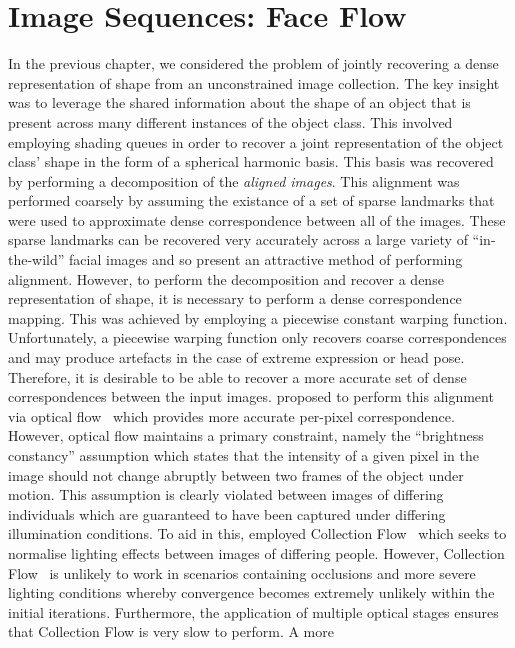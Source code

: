 \chapter{Image Sequences: Face Flow}\label{ch:face_flow}
\minitoc{}
In the previous chapter, we considered the problem of jointly recovering a
dense representation of shape from an unconstrained image collection. The key
insight was to leverage the shared information about the shape of an object
that is present across many different instances of the object class. This
involved employing shading queues in order to recover a joint representation
of the object class' shape in the form of a spherical harmonic basis. This
basis was recovered by performing a decomposition of the
\textit{aligned images}. This alignment was performed coarsely by assuming the
existance of a set of sparse landmarks that were used to approximate
dense correspondence between all of the images. These sparse landmarks can
be recovered very accurately across a large variety of ``in-the-wild'' facial
images and so present an attractive method of performing alignment. However,
to perform the decomposition and recover a dense representation of shape, it
is necessary to perform a dense correspondence mapping. This was achieved
by employing a piecewise constant warping function. Unfortunately, a
piecewise warping function only recovers coarse correspondences and may produce
artefacts in the case of extreme expression or head pose. Therefore, it is
desirable to be able to recover a more accurate set of dense correspondences 
between the input images. \citet{KemelmacherShlizerman:2013iv} proposed to
perform this alignment via optical flow~\cite{liu2009beyond} which provides
more accurate per-pixel correspondence. However, optical flow maintains a
primary constraint, namely the ``brightness constancy'' assumption which states
that the intensity of a given pixel in the image should not change abruptly
between two frames of the object under motion. This assumption is clearly
violated between images of differing individuals which are guaranteed to
have been captured under differing illumination conditions. To aid in this,
\citet{KemelmacherShlizerman:2013iv} employed
Collection Flow~\cite{kemelmacher2012collection} which seeks to normalise
lighting effects between images of differing people. However, 
Collection Flow~\cite{kemelmacher2012collection} is unlikely to work in
scenarios containing occlusions and more severe lighting conditions whereby
convergence becomes extremely unlikely within the initial iterations. 
Furthermore, the application of multiple optical stages ensures that Collection
Flow is very slow to perform. A more 



